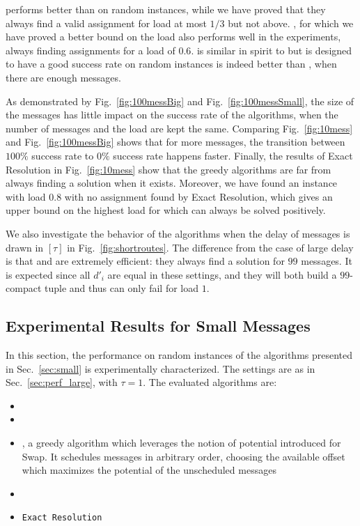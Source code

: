 \documentclass[pdflatex,sn-mathphys,iicol]{sn-jnl}%
\theoremstyle{thmstyleone}%
\theoremstyle{thmstyletwo}%
\theoremstyle{thmstylethree}%
\begin{document}
\firstfit performs better than \metaoffset on random instances, while we have proved that
they always find a valid assignment for load at most $1/3$ but not above.
 \compactpair, for which we have proved a better bound on the load also performs well in the experiments, always finding assignments for a load of $0.6$. \compactfit is similar in spirit to \compactpair but is designed to have a good success rate on random instances is indeed better than \compactpair, when there are enough messages.

As demonstrated by Fig.~\ref{fig:100messBig} and Fig.~\ref{fig:100messSmall}, the size of the messages has little impact on the success rate of the algorithms, when the number of messages and the load are kept the same. Comparing Fig.~\ref{fig:10mess} and Fig.~\ref{fig:100messBig} shows that for more messages, the transition between $100\%$ success rate to $0\%$ success rate happens faster.
Finally, the results of Exact Resolution in Fig.~\ref{fig:10mess} show that the greedy algorithms are far from always finding a solution when it exists. Moreover, we have found an instance with load $0.8$ with no assignment found by Exact Resolution, which gives an upper bound on the highest load for which \pma can always be solved positively.

We also investigate the behavior of the algorithms when the delay of messages is drawn in $[\tau]$ in Fig.~\ref{fig:shortroutes}. The difference from the case of large delay is that \compactpair and \compactfit are extremely efficient: they always find a solution for $99$ messages. It is expected since all $d'_i$ are equal in these settings, and they will both build a $99$-compact tuple and thus can only fail for load $1$.

\subsection{Experimental Results for Small Messages} \label{sec:perf_small}


In this section, the performance on random instances of the algorithms presented in Sec.~\ref{sec:small} is experimentally characterized. The settings are as in Sec.~\ref{sec:perf_large}, with $\tau = 1$. The evaluated algorithms are:

\begin{itemize}
  \item \firstfit
  \item \greedyuniform 
  \item \greedypotential, a greedy algorithm which leverages the notion of potential introduced for Swap. 
  It schedules messages in arbitrary order, choosing the available offset which maximizes the potential of the unscheduled messages
  \item \swapandmove 
  \item \texttt{Exact Resolution}
\end{itemize}
\end{document}
